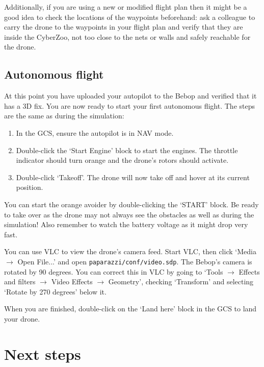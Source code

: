 Additionally, if you are using a new or modified flight plan then it might be a good idea to check the locations of the waypoints beforehand: ask a colleague to carry the drone to the waypoints in your flight plan and verify that they are inside the CyberZoo, not too close to the nets or walls and safely reachable for the drone.
	
\subsection*{Autonomous flight}
At this point you have uploaded your autopilot to the Bebop and verified that it has a 3D fix.
You are now ready to start your first autonomous flight.
The steps are the same as during the simulation:

\begin{enumerate}
	\item In the GCS, ensure the autopilot is in NAV mode.
	\item Double-click the `Start Engine' block to start the engines. The throttle indicator should turn orange and the drone's rotors should activate.
	\item Double-click `Takeoff'. The drone will now take off and hover at its current position.
\end{enumerate}

You can start the orange avoider by double-clicking the `START' block. Be ready to take over as the drone may not always see the obstacles as well as during the simulation! Also remember to watch the battery voltage as it might drop very fast.

You can use VLC to view the drone's camera feed. Start VLC, then click `Media $\rightarrow$ Open File...' and open \verb"paparazzi/conf/video.sdp".
The Bebop's camera is rotated by 90 degrees. You can correct this in VLC by going to `Tools $\rightarrow$ Effects and filters $\rightarrow$ Video Effects $\rightarrow$ Geometry', checking `Transform' and selecting `Rotate by 270 degrees' below it.

When you are finished, double-click on the `Land here' block in the GCS to land your drone.

\section{Next steps}
